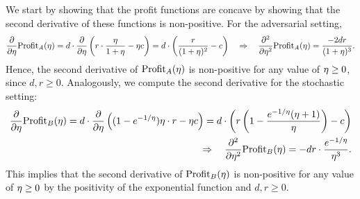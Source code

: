 We start by showing that the profit functions are concave by showing that the second derivative of these functions is non-positive. For the adversarial setting,
\begin{equation*}
    \frac{\partial}{\partial \eta} \text{Profit}_{A}(\eta) = d \cdot \frac{\partial}{\partial \eta} \left(r \cdot \frac{\eta}{1+\eta} - \eta c\right) = d \cdot \left( \frac{r}{(1+\eta)^2} - c \right) \quad \Rightarrow \quad \frac{\partial^2}{\partial \eta^2}\text{Profit}_{A}(\eta) = \frac{-2dr}{(1+\eta)^3}.
\end{equation*}
Hence, the second derivative of $\text{Profit}_{A}(\eta)$ is non-positive for any value of $\eta \geq 0$, since $d, r \geq 0$. Analogously, we compute the second derivative for the stochastic setting:
\begin{align*}
    \frac{\partial}{\partial \eta}\text{Profit}_{B}(\eta) = d \cdot \frac{\partial}{\partial \eta} \left((1-e^{-1/\eta})\eta \cdot r - \eta c\right) = d \cdot \left( r \left(1 - \frac{e^{-1/\eta}(\eta+1)}{\eta} \right) - c \right)\\
    \quad \Rightarrow \quad \frac{\partial^2}{\partial \eta^2}\text{Profit}_{B}(\eta) = -dr \cdot \frac{e^{-1/\eta}}{\eta^3}.
\end{align*}
This implies that the second derivative of $\text{Profit}_{B}(\eta)$ is non-positive for any value of $\eta \geq 0$ by the positivity of the exponential function and $d,r \geq 0$.

